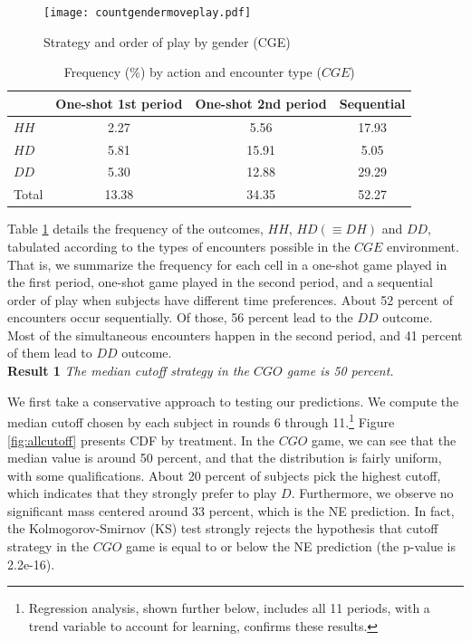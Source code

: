 \documentclass[11pt, letterpaper]{article}
\theoremstyle{plain}
\begin{document}
\begin{center}
\begin{figure}[ht]
\centering{}%
\texttt{[image: countgendermoveplay.pdf]}%
\caption{Strategy and order of play by gender (CGE)} 
\label{fig:cgepooled}
\end{figure}
\end{center}


\begin{table}[ht]
\centering\caption{Frequency (\%) by action and encounter type ($CGE$)}

\begin{tabular}{lccc}
\hline
 & One-shot 1st period & One-shot 2nd period  & Sequential\\
  \hline
  $HH$ &  2.27 & 5.56 & 17.93 \\
  $HD$ & 5.81 & 15.91 & 5.05 \\
  $DD$& 5.30 & 12.88 & 29.29 \\
  \hline
Total & 13.38 & 34.35 & 52.27\\
\end{tabular}

\label{tab(CGE)}
\end{table}

Table \ref{tab(CGE)} details the frequency of the outcomes, $HH$, $HD(\equiv DH)$ and $DD$, tabulated according to the types of encounters possible in the $CGE$ environment. That is, we summarize the frequency for each cell in a one-shot game played in the first period, one-shot game played in the second period, and a sequential order of play when subjects have different time preferences. About 52 percent of encounters occur sequentially. Of those, 56 percent lead to the $DD$ outcome. Most of the simultaneous encounters happen in the second period, and 41 percent of them lead to $DD$ outcome.  \\


\noindent \textbf{Result 1}
\textit{The median cutoff strategy in the $CGO$ game is 50 percent.}

We first take a conservative approach to testing our predictions. We compute the median cutoff chosen by each subject in rounds 6 through 11.\footnote{Regression analysis, shown further below, includes all 11 periods, with a trend variable to account for learning, confirms these results.} Figure \ref{fig:allcutoff} presents CDF by treatment. In the $CGO$ game, we can see that the median value is around 50 percent, and that the distribution is fairly uniform, with some qualifications. About 20 percent of subjects pick the highest cutoff, which indicates that they strongly prefer to play $D$. Furthermore, we observe no significant mass centered around 33 percent, which is the NE prediction. In fact, the Kolmogorov-Smirnov (KS) test strongly rejects the hypothesis that cutoff strategy in the $CGO$ game is equal to or below the NE prediction (the p-value is 2.2e-16).
\end{document}
